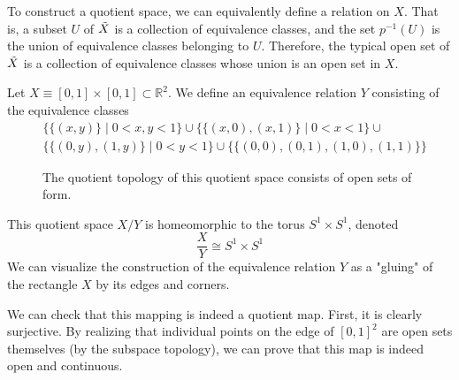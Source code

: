     To construct a quotient space, we can equivalently define a relation on $X$. That is, a subset $U$ of $\Tilde{X}$ is a collection of equivalence classes, and the set $p^{-1}(U)$ is the union of equivalence classes belonging to $U$. Therefore, the typical open set of $\Tilde{X}$ is a collection of equivalence classes whose union is an open set in $X$. 

    \begin{example}
      Let $X \equiv [0,1] \times [0,1] \subset \mathbb{R}^2$. We define an equivalence relation $Y$ consisting of the equivalence classes
      \begin{align*}
          &\big\{\{(x, y)\} \; | \; 0<x, y<1\big\} \cup \big\{ \{(x, 0), (x,1)\} \; | \; 0<x<1 \big\} \cup \\
          &\big\{ \{(0,y), (1,y)\} \; | \; 0<y<1 \big\} \cup \big\{ \{(0,0), (0,1), (1,0), (1,1)\} \big\}
      \end{align*} 

      \begin{figure}[H]
        \centering 
        \caption{The quotient topology of this quotient space consists of open sets of form. } 
        \label{fig:torus_basis}
      \end{figure}
      This quotient space $X / Y$ is homeomorphic to the torus $S^1 \times S^1$, denoted
      \begin{equation}
        \frac{X}{Y} \cong S^1 \times S^1
      \end{equation}
      We can visualize the construction of the equivalence relation $Y$ as a "gluing" of the rectangle $X$ by its edges and corners. 

      We can check that this mapping is indeed a quotient map. First, it is clearly surjective. By realizing that individual points on the edge of $[0,1]^2$ are open sets themselves (by the subspace topology), we can prove that this map is indeed open and continuous. 
    \end{example}

